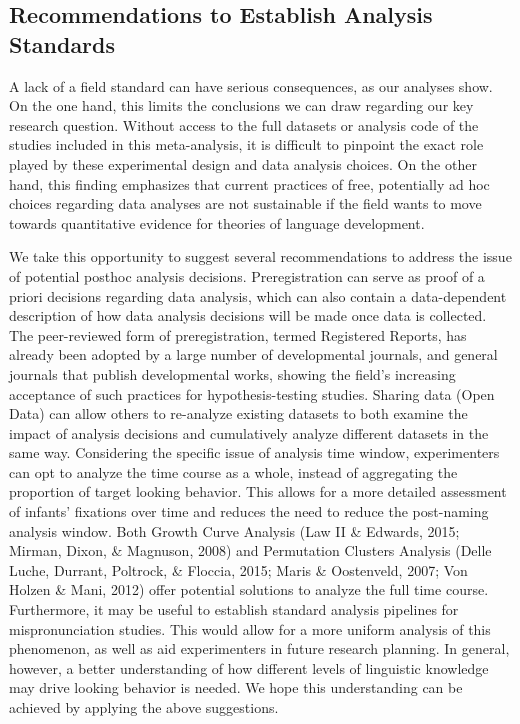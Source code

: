 \documentclass[man]{apa6}
\begin{document}
\hypertarget{recommendations-to-establish-analysis-standards}{%
\subsection{Recommendations to Establish Analysis Standards}\label{recommendations-to-establish-analysis-standards}}

A lack of a field standard can have serious consequences, as our analyses show. On the one hand, this limits the conclusions we can draw regarding our key research question. Without access to the full datasets or analysis code of the studies included in this meta-analysis, it is difficult to pinpoint the exact role played by these experimental design and data analysis choices. On the other hand, this finding emphasizes that current practices of free, potentially ad hoc choices regarding data analyses are not sustainable if the field wants to move towards quantitative evidence for theories of language development.

We take this opportunity to suggest several recommendations to address the issue of potential posthoc analysis decisions. Preregistration can serve as proof of a priori decisions regarding data analysis, which can also contain a data-dependent description of how data analysis decisions will be made once data is collected. The peer-reviewed form of preregistration, termed Registered Reports, has already been adopted by a large number of developmental journals, and general journals that publish developmental works, showing the field's increasing acceptance of such practices for hypothesis-testing studies. Sharing data (Open Data) can allow others to re-analyze existing datasets to both examine the impact of analysis decisions and cumulatively analyze different datasets in the same way. Considering the specific issue of analysis time window, experimenters can opt to analyze the time course as a whole, instead of aggregating the proportion of target looking behavior. This allows for a more detailed assessment of infants' fixations over time and reduces the need to reduce the post-naming analysis window. Both Growth Curve Analysis (Law II \& Edwards, 2015; Mirman, Dixon, \& Magnuson, 2008) and Permutation Clusters Analysis (Delle Luche, Durrant, Poltrock, \& Floccia, 2015; Maris \& Oostenveld, 2007; Von Holzen \& Mani, 2012) offer potential solutions to analyze the full time course. Furthermore, it may be useful to establish standard analysis pipelines for mispronunciation studies. This would allow for a more uniform analysis of this phenomenon, as well as aid experimenters in future research planning. In general, however, a better understanding of how different levels of linguistic knowledge may drive looking behavior is needed. We hope this understanding can be achieved by applying the above suggestions.
\end{document}
